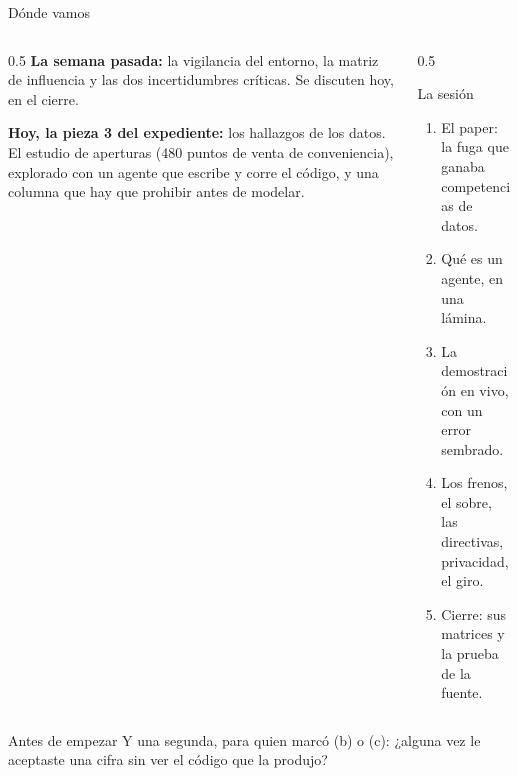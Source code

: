 \documentclass{beamer}
\begin{document}
\begin{frame}
\titlepage
\end{frame}

\begin{frame}{Dónde vamos}
\begin{columns}[T]
\begin{column}{0.5\textwidth}
\textbf{La semana pasada:} la vigilancia del entorno, la matriz de influencia y las dos incertidumbres críticas. Se discuten hoy, en el cierre.

\medskip
\textbf{Hoy, la pieza 3 del expediente:} los hallazgos de los datos. El estudio de aperturas (480 puntos de venta de conveniencia), explorado con un agente que escribe y corre el código, y una columna que hay que prohibir antes de modelar.
\end{column}
\begin{column}{0.5\textwidth}
\begin{block}{La sesión}
\begin{enumerate}
  \item El paper: la fuga que ganaba competencias de datos.
  \item Qué es un agente, en una lámina.
  \item La demostración en vivo, con un error sembrado.
  \item Los frenos, el sobre, las directivas, privacidad, el giro.
  \item Cierre: sus matrices y la prueba de la fuente.
\end{enumerate}
\end{block}
\end{column}
\end{columns}
\end{frame}

\begin{frame}{Antes de empezar}
\medskip
Y una segunda, para quien marcó (b) o (c): ¿alguna vez le aceptaste una cifra sin ver el código que la produjo?
\end{frame}
\end{document}
